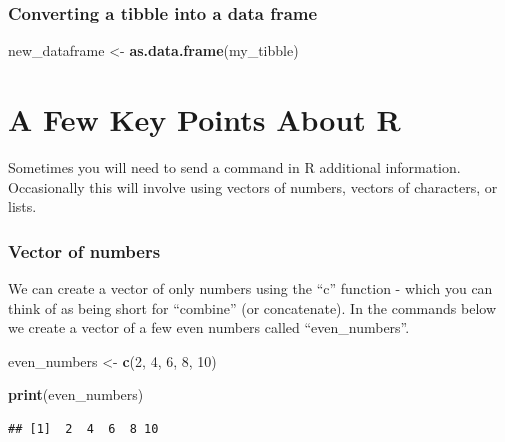 \documentclass[
]{krantz}
\makeatletter
\newenvironment{Shaded}{\begin{snugshade}}{\end{snugshade}}
\newcommand{\DecValTok}[1]{\textcolor[rgb]{0.06,0.06,0.06}{#1}}
\newcommand{\KeywordTok}[1]{\textcolor[rgb]{0.27,0.27,0.27}{\textbf{#1}}}
\newcommand{\NormalTok}[1]{#1}
\newcommand{\StringTok}[1]{\textcolor[rgb]{0.5,0.5,0.5}{#1}}
\newenvironment{kframe}{%
\medskip{}
\setlength{\fboxsep}{.8em}
 \def\at@end@of@kframe{}%
 \ifinner\ifhmode%
  \def\at@end@of@kframe{\end{minipage}}%
  \begin{minipage}{\columnwidth}%
 \fi\fi%
 \def\FrameCommand##1{\hskip\@totalleftmargin \hskip-\fboxsep
 \colorbox{shadecolor}{##1}\hskip-\fboxsep
     \hskip-\linewidth \hskip-\@totalleftmargin \hskip\columnwidth}%
 \MakeFramed {\advance\hsize-\width
   \@totalleftmargin\z@ \linewidth\hsize
   \@setminipage}}%
 {\par\unskip\endMakeFramed%
 \at@end@of@kframe}
\renewenvironment{Shaded}{\begin{kframe}}{\end{kframe}}
\makeatother
\begin{document}
\hypertarget{converting-a-tibble-into-a-data-frame}{%
\subsubsection{Converting a tibble into a data frame}\label{converting-a-tibble-into-a-data-frame}}

\begin{Shaded}
\begin{Highlighting}[]
\NormalTok{new_dataframe <-}\StringTok{ }\KeywordTok{as.data.frame}\NormalTok{(my_tibble)}
\end{Highlighting}
\end{Shaded}

\hypertarget{a-few-key-points-about-r}{%
\section{A Few Key Points About R}\label{a-few-key-points-about-r}}

Sometimes you will need to send a command in R additional information. Occasionally this will involve using vectors of numbers, vectors of characters, or lists.

\hypertarget{vector-of-numbers}{%
\subsubsection{Vector of numbers}\label{vector-of-numbers}}

We can create a vector of only numbers using the ``c'' function - which you can think of as being short for ``combine'' (or concatenate). In the commands below we create a vector of a few even numbers called ``even\_numbers''.

\begin{Shaded}
\begin{Highlighting}[]
\NormalTok{even_numbers <-}\StringTok{ }\KeywordTok{c}\NormalTok{(}\DecValTok{2}\NormalTok{, }\DecValTok{4}\NormalTok{, }\DecValTok{6}\NormalTok{, }\DecValTok{8}\NormalTok{, }\DecValTok{10}\NormalTok{)}
\end{Highlighting}
\end{Shaded}

\begin{Shaded}
\begin{Highlighting}[]
\KeywordTok{print}\NormalTok{(even_numbers)}
\end{Highlighting}
\end{Shaded}

\begin{verbatim}
## [1]  2  4  6  8 10
\end{verbatim}
\end{document}
